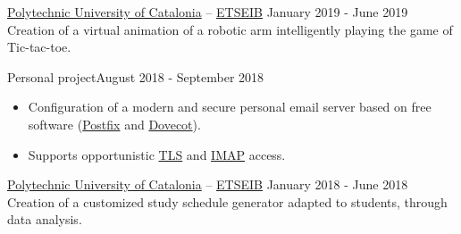 \documentclass[10pt, a4paper, ragged2e]{altacv}
\begin{document}
\divider

{\href{https://www.upc.edu/en}{Polytechnic University of Catalonia} --
\href{https://etseib.upc.edu/en}{ETSEIB}}
{January 2019 - June 2019}{}
Creation of a virtual animation of a robotic arm intelligently playing the game
of Tic-tac-toe.

\divider

{Personal project}{August 2018 - September 2018}{}
\begin{itemize}
  \item Configuration of a modern and secure personal email server based on
  free software (\href{http://www.postfix.org/}{Postfix} and
  \href{https://www.dovecot.org/}{Dovecot}).
  \item Supports opportunistic
  \href{https://en.wikipedia.org/wiki/Transport_Layer_Security}{TLS} and
  \href{https://en.wikipedia.org/wiki/Internet_Message_Access_Protocol}
  {IMAP} access.
\end{itemize}

\divider

{\href{https://www.upc.edu/en}{Polytechnic University of Catalonia} --
\href{https://etseib.upc.edu/en}{ETSEIB}}
{January 2018 - June 2018}{}
Creation of a customized study schedule generator adapted to students, through
data analysis.


\medskip


\end{document}
